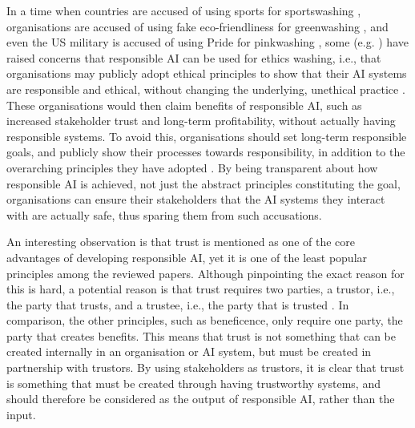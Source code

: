 In a time when countries are accused of using sports for sportswashing \parencite{Fruh_2022_sportswashing,Wearing_2022_sportswashing}, organisations are accused of using fake eco-friendliness for greenwashing \parencite{Gibbens_2022_greenwashing}, and even the US military is accused of using Pride for pinkwashing \parencite{Kane_2022_pinkwashing}, some (e.g. \cite{Gianni_2022,Havrda_2020,Morley_2021}) have raised concerns that responsible AI can be used for ethics washing, i.e., that organisations may publicly adopt ethical principles to show that their AI systems are responsible and ethical, without changing the underlying, unethical practice \parencite{Morley_2021}. These organisations would then claim benefits of responsible AI, such as increased stakeholder trust and long-term profitability, without actually having responsible systems. To avoid this, organisations should set long-term responsible goals, and publicly show their processes towards responsibility, in addition to the overarching principles they have adopted \parencite{Rakova_2021}. By being transparent about how responsible AI is achieved, not just the abstract principles constituting the goal, organisations can ensure their stakeholders that the AI systems they interact with are actually safe, thus sparing them from such accusations.


An interesting observation is that trust is mentioned as one of the core advantages of developing responsible AI, yet it is one of the least popular principles among the reviewed papers. Although pinpointing the exact reason for this is hard, a potential reason is that trust requires two parties, a trustor, i.e., the party that trusts, and a trustee, i.e., the party that is trusted \parencite{Huang_2006_trust}. In comparison, the other principles, such as beneficence, only require one party, the party that creates benefits. This means that trust is not something that can be created internally in an organisation or AI system, but must be created in partnership with trustors. By using stakeholders as trustors, it is clear that trust is something that must be created through having trustworthy systems, and should therefore be considered as the output of responsible AI, rather than the input.


